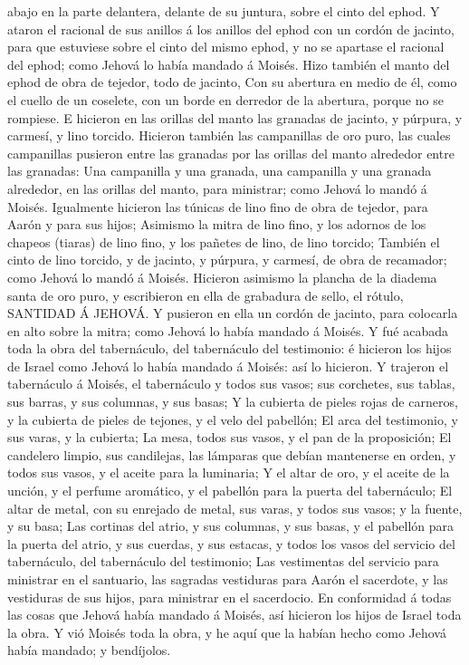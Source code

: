abajo en la parte delantera, delante de su juntura, sobre el cinto del
ephod.  Y ataron el racional de sus anillos á los anillos
del ephod con un cordón de jacinto, para que estuviese sobre el cinto
del mismo ephod, y no se apartase el racional del ephod; como Jehová lo
había mandado á Moisés.  Hizo también el manto del ephod
de obra de tejedor, todo de jacinto,  Con su abertura en
medio de él, como el cuello de un coselete, con un borde en derredor de
la abertura, porque no se rompiese.  E hicieron en las
orillas del manto las granadas de jacinto, y púrpura, y carmesí, y lino
torcido.  Hicieron también las campanillas de oro puro,
las cuales campanillas pusieron entre las granadas por las orillas del
manto alrededor entre las granadas:  Una campanilla y una
granada, una campanilla y una granada alrededor, en las orillas del
manto, para ministrar; como Jehová lo mandó á Moisés. 
Igualmente hicieron las túnicas de lino fino de obra de tejedor, para
Aarón y para sus hijos;  Asimismo la mitra de lino fino,
y los adornos de los chapeos (tiaras) de lino fino, y los pañetes de
lino, de lino torcido;  También el cinto de lino torcido,
y de jacinto, y púrpura, y carmesí, de obra de recamador; como Jehová lo
mandó á Moisés.  Hicieron asimismo la plancha de la
diadema santa de oro puro, y escribieron en ella de grabadura de sello,
el rótulo, SANTIDAD Á JEHOVÁ.  Y pusieron en ella un
cordón de jacinto, para colocarla en alto sobre la mitra; como Jehová lo
había mandado á Moisés.  Y fué acabada toda la obra del
tabernáculo, del tabernáculo del testimonio: é hicieron los hijos de
Israel como Jehová lo había mandado á Moisés: así lo hicieron.
 Y trajeron el tabernáculo á Moisés, el tabernáculo y
todos sus vasos; sus corchetes, sus tablas, sus barras, y sus columnas,
y sus basas;  Y la cubierta de pieles rojas de carneros,
y la cubierta de pieles de tejones, y el velo del pabellón;
 El arca del testimonio, y sus varas, y la cubierta;
 La mesa, todos sus vasos, y el pan de la proposición;
 El candelero limpio, sus candilejas, las lámparas que
debían mantenerse en orden, y todos sus vasos, y el aceite para la
luminaria;  Y el altar de oro, y el aceite de la unción,
y el perfume aromático, y el pabellón para la puerta del tabernáculo;
 El altar de metal, con su enrejado de metal, sus varas,
y todos sus vasos; y la fuente, y su basa;  Las cortinas
del atrio, y sus columnas, y sus basas, y el pabellón para la puerta del
atrio, y sus cuerdas, y sus estacas, y todos los vasos del servicio del
tabernáculo, del tabernáculo del testimonio;  Las
vestimentas del servicio para ministrar en el santuario, las sagradas
vestiduras para Aarón el sacerdote, y las vestiduras de sus hijos, para
ministrar en el sacerdocio.  En conformidad á todas las
cosas que Jehová había mandado á Moisés, así hicieron los hijos de
Israel toda la obra.  Y vió Moisés toda la obra, y he
aquí que la habían hecho como Jehová había mandado; y bendíjolos.

